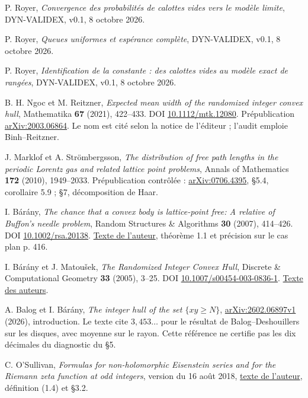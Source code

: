 \documentclass[11pt,a4paper]{article}
\newcommand{\head}[1]{\vspace{3pt}{\large\bfseries\color{navy}#1}\par}
\begin{document}
\newpage
\head{7. Références et contenu du dossier de vérification}
\begin{description}[leftmargin=15mm,labelwidth=12mm]
\item[CV] P. Royer, \emph{Convergence des probabilités de calottes vides vers le modèle limite}, DYN-VALIDEX, v0.1, 8 octobre 2026.
\item[QU] P. Royer, \emph{Queues uniformes et espérance complète}, DYN-VALIDEX, v0.1, 8 octobre 2026.
\item[ID] P. Royer, \emph{Identification de la constante : des calottes vides au modèle exact de rangées}, DYN-VALIDEX, v0.1, 8 octobre 2026.
\item[NR] B. H. Ngoc et M. Reitzner, \emph{Expected mean width of the randomized integer convex hull}, Mathematika \textbf{67} (2021), 422--433. DOI \href{https://doi.org/10.1112/mtk.12080}{10.1112/mtk.12080}. Prépublication \href{https://arxiv.org/abs/2003.06864}{arXiv:2003.06864}. Le nom est cité selon la notice de l'éditeur ; l'audit emploie Binh--Reitzner.
\item[MS] J. Marklof et A. Strömbergsson, \emph{The distribution of free path lengths in the periodic Lorentz gas and related lattice point problems}, Annals of Mathematics \textbf{172} (2010), 1949--2033. Prépublication contrôlée : \href{https://arxiv.org/pdf/0706.4395}{arXiv:0706.4395}, §5.4, corollaire 5.9 ; §7, décomposition de Haar.
\item[B] I. Bárány, \emph{The chance that a convex body is lattice-point free: A relative of Buffon's needle problem}, Random Structures \& Algorithms \textbf{30} (2007), 414--426. DOI \href{https://doi.org/10.1002/rsa.20138}{10.1002/rsa.20138}. \href{https://www.renyi.hu/~barany/cikkek/106.pdf}{Texte de l'auteur}, théorème 1.1 et précision sur le cas plan p. 416.
\item[BM] I. Bárány et J. Matoušek, \emph{The Randomized Integer Convex Hull}, Discrete \& Computational Geometry \textbf{33} (2005), 3--25. DOI \href{https://doi.org/10.1007/s00454-003-0836-1}{10.1007/s00454-003-0836-1}. \href{https://www.renyi.hu/~barany/cikkek/95.pdf}{Texte des auteurs}.
\item[BB] A. Balog et I. Bárány, \emph{The integer hull of the set $\{xy\ge N\}$}, \href{https://arxiv.org/html/2602.06897v1}{arXiv:2602.06897v1} (2026), introduction. Le texte cite $3{,}453\ldots$ pour le résultat de Balog--Deshouillers sur les disques, avec moyenne sur le rayon. Cette référence ne certifie pas les dix décimales du diagnostic du §5.
\item[OS] C. O'Sullivan, \emph{Formulas for non-holomorphic Eisenstein series and for the Riemann zeta function at odd integers}, version du 16 août 2018, \href{https://fsw01.bcc.cuny.edu/cormac.osullivan/Research/Eisenstein-series-Riemann-zeta3.pdf}{texte de l'auteur}, définition (1.4) et §3.2.
\end{description}
\end{document}
